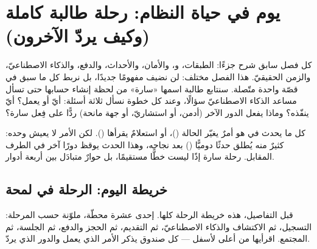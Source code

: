 \section{يوم في حياة النظام: رحلة طالبة كاملة (وكيف يردّ الآخرون)}

كل فصل سابق شرح جزءًا: الطبقات، و، والأمان، والأحداث، والدفع،
والذكاء الاصطناعيّ، والزمن الحقيقيّ. هذا الفصل مختلف: لن نضيف مفهومًا جديدًا،
بل نربط كل ما سبق في قصّة واحدة متّصلة. سنتابع طالبة اسمها «سارة» من
لحظة إنشاء حسابها حتى تسأل مساعد الذكاء الاصطناعيّ سؤالًا، وعند كل خطوة نسأل
ثلاثة أسئلة: أيّ  أو  يعمل؟ أيّ  ينفّذه؟ وماذا
يفعل الدور الآخر (أدمن، أو استشاريّ، أو جهة مانحة) ردًّا على فِعل سارة؟

\begin{idea}
كل ما يحدث في  هو أمرٌ يغيّر الحالة ()، أو استعلامٌ
يقرأها (). لكن الأمر لا يعيش وحده: كثيرٌ منه يُطلق حدثًا دوميًّا
() بعد نجاحه، وهذا الحدث يوقظ دورًا آخر في الطرف المقابل. رحلة
سارة إذًا ليست خطًّا مستقيمًا، بل حوارٌ متبادَل بين أربعة أدوار.
\end{idea}

\subsection{خريطة اليوم: الرحلة في لمحة}

قبل التفاصيل، هذه خريطة الرحلة كلها. إحدى عشرة محطّة، ملوّنة حسب المرحلة: التسجيل،
ثم الاكتشاف والذكاء الاصطناعيّ، ثم التقديم، ثم الحجز والدفع، ثم الجلسة، ثم المجتمع.
اقرأيها من أعلى لأسفل — كل صندوق يذكر الأمر الذي يعمل والدور الذي يردّ.

